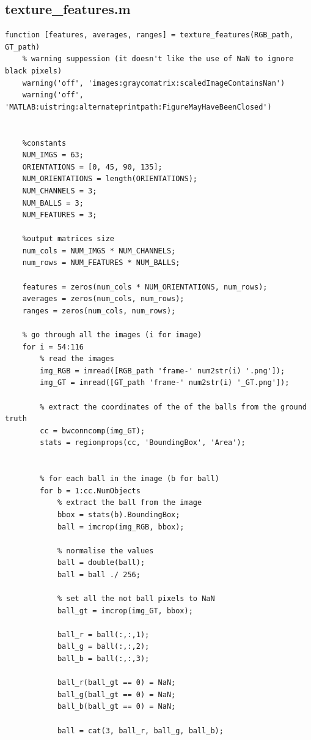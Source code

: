 \documentclass[conference]{IEEEtran}
\begin{document}
        \subsection{texture\_features.m}
            \begin{lstlisting}[style=Matlab-editor, basicstyle=\scriptsize]
function [features, averages, ranges] = texture_features(RGB_path, GT_path)
    % warning suppession (it doesn't like the use of NaN to ignore black pixels)
    warning('off', 'images:graycomatrix:scaledImageContainsNan')
    warning('off', 'MATLAB:uistring:alternateprintpath:FigureMayHaveBeenClosed')

    
    %constants
    NUM_IMGS = 63;
    ORIENTATIONS = [0, 45, 90, 135];
    NUM_ORIENTATIONS = length(ORIENTATIONS);
    NUM_CHANNELS = 3;
    NUM_BALLS = 3;
    NUM_FEATURES = 3;

    %output matrices size
    num_cols = NUM_IMGS * NUM_CHANNELS;
    num_rows = NUM_FEATURES * NUM_BALLS;

    features = zeros(num_cols * NUM_ORIENTATIONS, num_rows);
    averages = zeros(num_cols, num_rows);
    ranges = zeros(num_cols, num_rows);

    % go through all the images (i for image)
    for i = 54:116 
        % read the images
        img_RGB = imread([RGB_path 'frame-' num2str(i) '.png']);
        img_GT = imread([GT_path 'frame-' num2str(i) '_GT.png']);

        % extract the coordinates of the of the balls from the ground truth
        cc = bwconncomp(img_GT);
        stats = regionprops(cc, 'BoundingBox', 'Area');


        % for each ball in the image (b for ball)
        for b = 1:cc.NumObjects 
            % extract the ball from the image
            bbox = stats(b).BoundingBox;
            ball = imcrop(img_RGB, bbox);

            % normalise the values
            ball = double(ball);
            ball = ball ./ 256;

            % set all the not ball pixels to NaN
            ball_gt = imcrop(img_GT, bbox);

            ball_r = ball(:,:,1);
            ball_g = ball(:,:,2);
            ball_b = ball(:,:,3);

            ball_r(ball_gt == 0) = NaN;
            ball_g(ball_gt == 0) = NaN;
            ball_b(ball_gt == 0) = NaN;

            ball = cat(3, ball_r, ball_g, ball_b);


\end{lstlisting}
\end{document}
